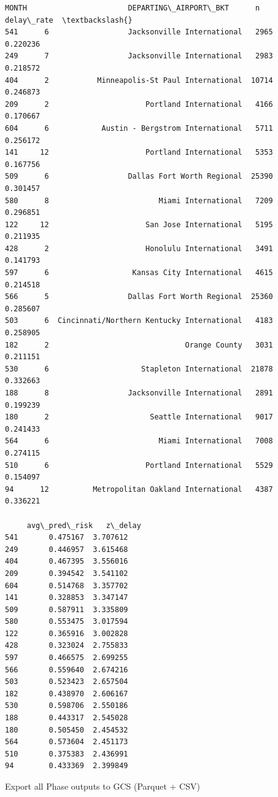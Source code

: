\documentclass[11pt]{article}
\begin{document}
    
    \begin{Verbatim}[commandchars=\\\{\}]
     MONTH                       DEPARTING\_AIRPORT\_BKT      n  delay\_rate  \textbackslash{}
541      6                  Jacksonville International   2965    0.220236   
249      7                  Jacksonville International   2983    0.218572   
404      2           Minneapolis-St Paul International  10714    0.246873   
209      2                      Portland International   4166    0.170667   
604      6            Austin - Bergstrom International   5711    0.256172   
141     12                      Portland International   5353    0.167756   
509      6                  Dallas Fort Worth Regional  25390    0.301457   
580      8                         Miami International   7209    0.296851   
122     12                      San Jose International   5195    0.211935   
428      2                      Honolulu International   3491    0.141793   
597      6                   Kansas City International   4615    0.214518   
566      5                  Dallas Fort Worth Regional  25360    0.285607   
503      6  Cincinnati/Northern Kentucky International   4183    0.258905   
182      2                               Orange County   3031    0.211151   
530      6                     Stapleton International  21878    0.332663   
188      8                  Jacksonville International   2891    0.199239   
180      2                       Seattle International   9017    0.241433   
564      6                         Miami International   7008    0.274115   
510      6                      Portland International   5529    0.154097   
94      12          Metropolitan Oakland International   4387    0.336221   

     avg\_pred\_risk   z\_delay  
541       0.475167  3.707612  
249       0.446957  3.615468  
404       0.467395  3.556016  
209       0.394542  3.541102  
604       0.514768  3.357702  
141       0.328853  3.347147  
509       0.587911  3.335809  
580       0.553475  3.017594  
122       0.365916  3.002828  
428       0.323024  2.755833  
597       0.466575  2.699255  
566       0.559640  2.674216  
503       0.523423  2.657504  
182       0.438970  2.606167  
530       0.598706  2.550186  
188       0.443317  2.545028  
180       0.505450  2.454532  
564       0.573604  2.451173  
510       0.375383  2.436991  
94        0.433369  2.399849  
    \end{Verbatim}

    
    Export all Phase outputs to GCS (Parquet + CSV)
\end{document}
